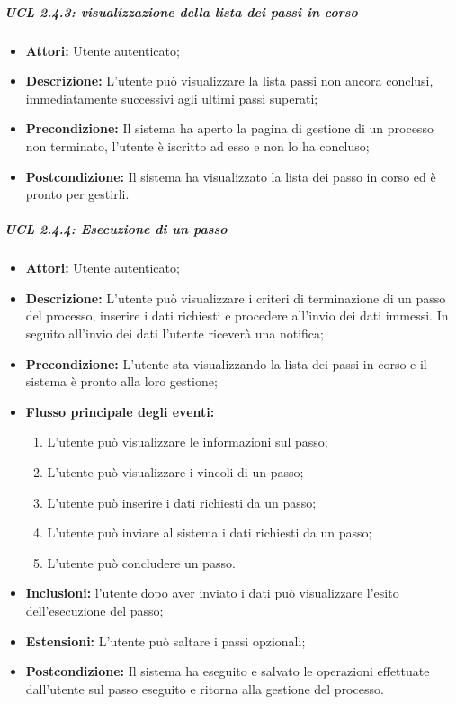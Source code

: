 \subparagraph{UCL 2.4.3: visualizzazione della lista dei passi in corso}
\begin{itemize}
\item \textbf{Attori:} Utente autenticato;
\item \textbf{Descrizione:} L'utente può visualizzare la lista passi non ancora conclusi, immediatamente successivi agli ultimi passi superati;
\item \textbf{Precondizione:} Il sistema ha aperto la pagina di gestione di un processo non terminato, l'utente è iscritto ad esso e non lo ha concluso;
\item \textbf{Postcondizione:} Il sistema ha visualizzato la lista dei passo in corso ed è pronto per gestirli.
\end{itemize}

\subparagraph{UCL 2.4.4: Esecuzione di un passo}
\begin{itemize}
\item \textbf{Attori:} Utente autenticato;
\item \textbf{Descrizione:} L'utente può visualizzare i criteri di terminazione di un passo del processo, inserire i dati richiesti e procedere all'invio dei dati immessi. In seguito all'invio dei dati l'utente riceverà una notifica;
\item \textbf{Precondizione:} L'utente sta visualizzando la lista dei passi in corso e il sistema è pronto alla loro gestione;
\item \textbf{Flusso principale degli eventi:}
\begin{enumerate}
\item L'utente può visualizzare le informazioni sul passo;
\item L'utente può visualizzare i vincoli di un passo;
\item L'utente può inserire i dati richiesti da un passo;
\item L'utente può inviare al sistema i dati richiesti da un passo;
\item L'utente può concludere un passo.
\end{enumerate}
\item \textbf{Inclusioni:} l'utente dopo aver inviato i dati può visualizzare l'esito dell'esecuzione del passo;
\item \textbf{Estensioni:} L'utente può saltare i passi opzionali;
\item \textbf{Postcondizione:} Il sistema ha eseguito e salvato le operazioni effettuate dall'utente sul passo eseguito e ritorna alla gestione del processo.
\end{itemize}

